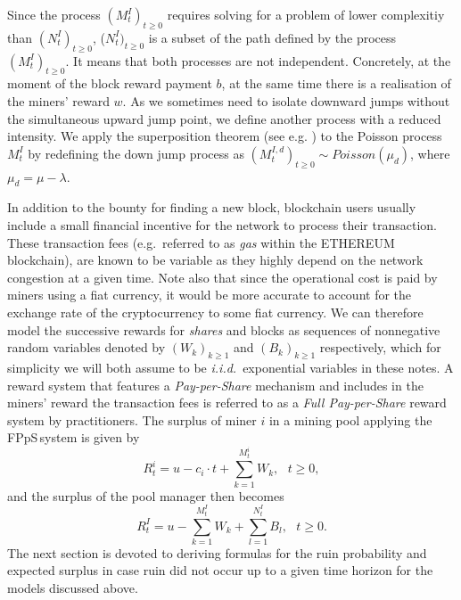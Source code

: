 \begin{remark}\label{remark_Md}
Since the process $(M_t^I)_{t\geq 0}$ requires solving for a problem of lower complexitiy than $(N_t^I)_{t\geq 0}$, ($N_t^I)_{t\geq 0}$ is a subset of the path defined by the process $(M_t^I)_{t\geq 0}$. It means that both processes are not independent. Concretely, at the moment of the block reward payment $b$, at the same time there is a realisation of the miners' reward $w$. As we sometimes need to isolate downward jumps without the simultaneous upward jump point, we define another process with a reduced intensity. We apply the superposition theorem (see e.g. \cite{Kingman1993}) to the Poisson process $M_t^I$ by redefining the down jump process as $(M_t^{I,d})_{t\geq 0} \sim Poisson(\mu_d)$, where $\mu_d = \mu-\lambda$.
\end{remark}
\noindent In addition to the bounty for finding a new block, blockchain users usually include a small financial incentive for the network to process their transaction. These transaction fees (e.g.\ referred to as \textit{gas} within the ETHEREUM blockchain), are known to be variable as they highly depend on the network congestion at a given time. Note also that since the operational cost is paid by miners using a fiat currency, it would be more accurate to account for the exchange rate of the cryptocurrency to some fiat currency. We can therefore model the successive rewards for \textit{shares} and blocks as sequences of nonnegative random variables denoted by $(W_k)_{k\geq1}$ and $(B_k)_{k\geq1}$ respectively, which for simplicity we will both assume to be \textit{i.i.d.}\  exponential variables in these notes. A reward system that features a \textit{Pay-per-Share} mechanism and includes in the miners' reward the transaction fees is referred to as a \textit{Full Pay-per-Share} reward system by practitioners. The surplus of miner $i$ in a mining pool applying the FPpS\,system is given by  
\begin{equation}\label{eq:surplus_miner_fpps}
R_t^i = u - c_i\cdot t + \sum_{k = 1}^{M^i_t}W_k,\text{ }t\geq0,
\end{equation}
and the surplus of the pool manager then becomes 
\begin{equation}\label{eq:surplus_manager_fpps}
R^I_t = u - \sum_{k = 1}^{M^I_t}W_k + \sum_{l = 1}^{N_t^I}B_l,\text{ }t\geq0. 
\end{equation}
The next section is devoted to deriving formulas for the ruin probability and expected surplus in case ruin did not occur up to a given time horizon for the models discussed above.

